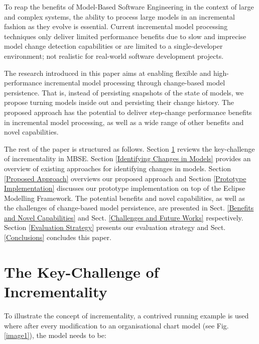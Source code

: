 \documentclass{llncs}
\begin{document}

To reap the benefits of Model-Based Software Engineering in the context of large and complex systems, the ability to process large models in an incremental fashion as they evolve is essential. Current incremental model processing techniques only deliver limited performance benefits due to slow and imprecise model change detection capabilities or are limited to a single-developer environment; not realistic for real-world software development projects.

The research introduced in this paper aims at enabling flexible and high-performance incremental model processing through change-based model persistence. That is, instead of persisting snapshots of the state of models, we propose turning models inside out and persisting their change history. The proposed approach has the potential to deliver step-change performance benefits in incremental model processing, as well as a wide range of other benefits and novel capabilities.

The rest of the paper is structured as follows. Section \ref{The Key-Challenge of Incrementality} reviews the key-challenge of incrementality in MBSE. Section \ref{Identifying Changes in Models} provides an overview of existing approaches for identifying changes in models. Section \ref{Proposed Approach} overviews our proposed approach and Section \ref{Prototype Implementation} discusses our prototype implementation on top of the Eclipse Modelling Framework. The potential benefits and novel capabilities, as well as the challenges of change-based model persistence, are presented in Sect. \ref{Benefits and Novel Capabilities} and Sect. \ref{Challenges and Future Works} respectively. Section \ref{Evaluation Strategy} presents our evaluation strategy and Sect. \ref{Conclusions} concludes this paper.

\section{The Key-Challenge of Incrementality}
\label{The Key-Challenge of Incrementality}
To illustrate the concept of incrementality, a contrived running example is used where after every modification to an organisational chart model (see Fig. \ref{image1}), the model needs to be:
\end{document}
